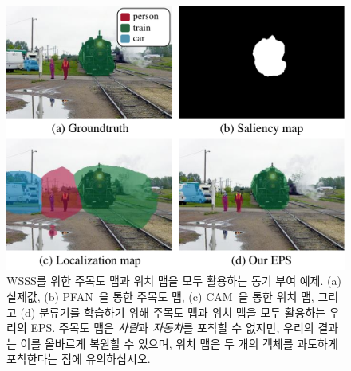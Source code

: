 \begin{figure}[t]
\centering
\includegraphics[width=8 cm]{figures/fig_concept.pdf}
\caption{WSSS를 위한 주목도 맵과 위치 맵을 모두 활용하는 동기 부여 예제. (a) 실제값, (b) PFAN~\cite{zhao2019pyramid}을 통한 주목도 맵, (c) CAM~\cite{zhou2016learning}을 통한 위치 맵, 그리고 (d) 분류기를 학습하기 위해 주목도 맵과 위치 맵을 모두 활용하는 우리의 EPS. 주목도 맵은 \emph{사람}과 \emph{자동차}를 포착할 수 없지만, 우리의 결과는 이를 올바르게 복원할 수 있으며, 위치 맵은 두 개의 객체를 과도하게 포착한다는 점에 유의하십시오.} \vspace{-2mm}
\label{fig:concept}
\end{figure}
